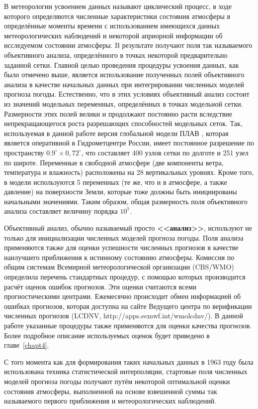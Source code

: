 В метеорологии усвоением данных называют циклический процесс, в ходе которого определяются численные характеристики состояния атмосферы в определённые моменты времени с использованием имеющихся данных метеорологических наблюдений и некоторой априорной информации об исследуемом состоянии атмосферы. B результате получают поля так называемого объективного анализа, определённого в точках некоторой предварительно заданной сетки.
Главной целью проведения процедуры усвоения данных, как было отмечено выше, является использование полученных полей объективного анализа в качестве начальных данных при интегрировании численных моделей прогноза погоды.
Естественно, что в этих условиях объективный анализ состоит из значений модельных переменных, определённых в точках модельной сетки. Размерности этих полей велики и продолжают постоянно расти вследствие непрекращающегося роста разрешающих способностей модельных сеток. Так, используемая в данной работе версия глобальной модели ПЛАВ \cite{Tolstykh-SLAV}, которая является оперативной в Гидрометцентре России, имеет постоянное разрешение по пространству ${0.9^{\circ}\times0,72^{\circ}}$, что составляет 400 узлов сетки по долготе и 251 узел по широте. Переменные в свободной атмосфере (две компоненты ветра, температура и влажность) расположены на 28 вертикальных уровнях. Кроме того, в модели используются 5 переменных (те же, что и в атмосфере, а также давление) на поверхности Земли, которые тоже должны быть инициированы начальными значениями. Таким образом, общая размерность поля объективного анализа составляет величину порядка ${10^7}$.

Объективный анализ, обычно называемый просто \textbf{<<анализ>>}, используют не только для инициализации численных моделей прогноза погоды. Поля анализа применяются также для оценки успешности численных прогнозов в качестве наилучшего приближения к истинному состоянию атмосферы. Комиссия по общим системам Всемирной метеорологической организации (CBS/WMO) определила перечень стандартных процедур\cite{WMO-CBS}, с помощью которых производится расчёт оценок ошибок прогнозов. Эти оценки считаются всеми прогностическими центрами. Ежемесячно происходит обмен информацией об ошибках прогнозов, которая доступна на сайте Ведущего центра по верификации численных прогнозов (LCDNV, http://apps.ecmwf.int/wmolcdnv/). В данной работе указанные процедуры также применяются для оценки качества прогнозов. Более подробное описание используемых оценок будет приведено в главе~\ref{chapt4}.

С того момента как для формирования таких начальных данных в 1963 году \cite{Gandin-1963} была использована техника статистической интерполяции, стартовые поля численных моделей прогноза погоды получают путём некоторой оптимальной оценки состояния атмосферы, выполненной на основе взвешенной суммы так называемого первого приближения и метеорологических наблюдений.


